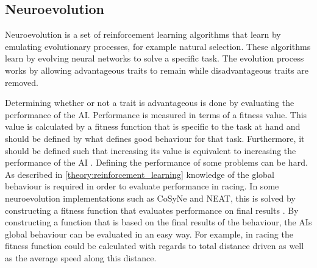 
\subsection{Neuroevolution}
\label{section:neuroevolution}
Neuroevolution is a set of reinforcement learning algorithms that learn by emulating evolutionary processes, for example natural selection. These algorithms learn by evolving neural networks to solve a specific task. The evolution process works by allowing advantageous traits to remain while disadvantageous traits are removed.  

Determining whether or not a trait is advantageous is done by evaluating the performance of the AI. Performance is measured in terms of a fitness value. This value is calculated by a fitness function that is specific to the task at hand and should be defined by what defines good behaviour for that task. Furthermore, it should be defined such that increasing its value is equivalent to increasing the performance of the AI \cite{nelson}. Defining the performance of some problems can be hard. As described in \ref{theory:reinforcement_learning} knowledge of the global behaviour is required in order to evaluate performance in racing. In some neuroevolution implementations such as CoSyNe and NEAT, this is solved by constructing a fitness function that evaluates performance on final results \cite{gomez:CoSyNE, stanley:neat}. By constructing a function that is based on the final results of the behaviour, the AIs global behaviour can be evaluated in an easy way. For example, in racing the fitness function could be calculated with regards to total distance driven as well as the average speed along this distance.

